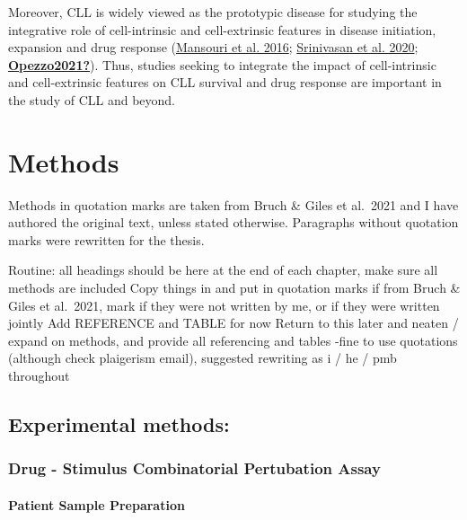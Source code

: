 \documentclass[11pt, a4paper, twosided]{book}
\begin{document}
Moreover, CLL is widely viewed as the prototypic disease for studying the integrative role of cell-intrinsic and cell-extrinsic features in disease initiation, expansion and drug response (\protect\hyperlink{ref-Mansouri2016}{Mansouri et al. 2016}; \protect\hyperlink{ref-Srinivasan2020}{Srinivasan et al. 2020}; \protect\hyperlink{ref-Opezzo2021}{\textbf{Opezzo2021?}}). Thus, studies seeking to integrate the impact of cell-intrinsic and cell-extrinsic features on CLL survival and drug response are important in the study of CLL and beyond.

\hypertarget{methods}{%
\chapter{Methods}\label{methods}}

Methods in quotation marks are taken from Bruch \& Giles et al.~2021 and I have authored the original text, unless stated otherwise. Paragraphs without quotation marks were rewritten for the thesis.

Routine:
all headings should be here
at the end of each chapter, make sure all methods are included
Copy things in and put in quotation marks if from Bruch \& Giles et al.~2021, mark if they were not written by me, or if they were written jointly
Add REFERENCE and TABLE for now
Return to this later and neaten / expand on methods, and provide all referencing and tables
-fine to use quotations (although check plaigerism email), suggested rewriting as i / he / pmb throughout

\hypertarget{experimental-methods}{%
\section{Experimental methods:}\label{experimental-methods}}

\hypertarget{drug---stimulus-combinatorial-pertubation-assay}{%
\subsection{Drug - Stimulus Combinatorial Pertubation Assay}\label{drug---stimulus-combinatorial-pertubation-assay}}

\hypertarget{patient-sample-preparation}{%
\subsubsection{Patient Sample Preparation}\label{patient-sample-preparation}}
\end{document}
